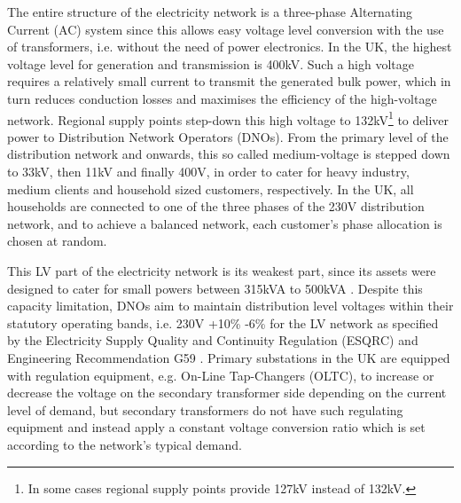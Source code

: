The entire structure of the electricity network is a three-phase Alternating Current (AC) system since this allows easy voltage level conversion with the use of transformers, i.e. without the need of power electronics.
In the UK, the highest voltage level for generation and transmission is 400kV.
Such a high voltage requires a relatively small current to transmit the generated bulk power, which in turn reduces conduction losses and maximises the efficiency of the high-voltage network.
Regional supply points step-down this high voltage to 132kV\footnote[1]{In some cases regional supply points provide 127kV instead of 132kV.} to deliver power to Distribution Network Operators (DNOs).
From the primary level of the distribution network and onwards, this so called medium-voltage is stepped down to 33kV, then 11kV and finally 400V, in order to cater for heavy industry, medium clients and household sized customers, respectively.
In the UK, all households are connected to one of the three phases of the 230V distribution network, and to achieve a balanced network, each customer's phase allocation is chosen at random.


This LV part of the electricity network is its weakest part, since its assets were designed to cater for small powers between 315kVA to 500kVA \cite{EDS08-0115}.
Despite this capacity limitation, DNOs aim to maintain distribution level voltages within their statutory operating bands, i.e. 230V +10\% -6\% for the LV network as specified by the Electricity Supply Quality and Continuity Regulation (ESQRC) \cite{HealthandSafetyExecutive2002} and Engineering Recommendation G59 \cite{EnergyNetworksAssociation2013}.
Primary substations in the UK are equipped with regulation equipment, e.g. On-Line Tap-Changers (OLTC), to increase or decrease the voltage on the secondary transformer side depending on the current level of demand, but secondary transformers do not have such regulating equipment and instead apply a constant voltage conversion ratio which is set according to the network's typical demand.

